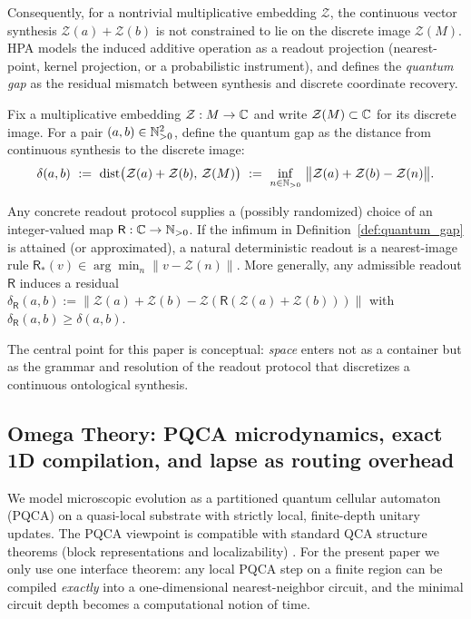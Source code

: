 Consequently, for a nontrivial multiplicative embedding $\mathcal{Z}$, the continuous vector synthesis $\mathcal{Z}(a)+\mathcal{Z}(b)$ is not constrained to lie on the discrete image $\mathcal{Z}(M)$. HPA models the induced additive operation as a readout projection (nearest-point, kernel projection, or a probabilistic instrument), and defines the \emph{quantum gap} as the residual mismatch between synthesis and discrete coordinate recovery.

\begin{definition}
\label{def:quantum_gap}
Fix a multiplicative embedding $\mathcal{Z}:M\to\mathbb{C}$ and write $\mathcal{Z}(M)\subset\mathbb{C}$ for its discrete image. For a pair $(a,b)\in\mathbb{N}_{>0}^2$, define the quantum gap as the distance from continuous synthesis to the discrete image:
\begin{equation}
\delta(a,b)\ :=\ \mathrm{dist}\bigl(\mathcal{Z}(a)+\mathcal{Z}(b),\,\mathcal{Z}(M)\bigr)
\ :=\ \inf_{n\in\NN_{>0}}\ \bigl\|\mathcal{Z}(a)+\mathcal{Z}(b)-\mathcal{Z}(n)\bigr\|.
\end{equation}
\end{definition}

\begin{remark}
\label{rem:readout_as_minimizer}
Any concrete readout protocol supplies a (possibly randomized) choice of an integer-valued map $\mathsf{R}:\mathbb{C}\to\mathbb{N}_{>0}$.
If the infimum in Definition~\ref{def:quantum_gap} is attained (or approximated), a natural deterministic readout is a nearest-image rule
$\mathsf{R}_*(v)\in\arg\min_{n}\|v-\mathcal{Z}(n)\|$.
More generally, any admissible readout $\mathsf{R}$ induces a residual
$\delta_{\mathsf{R}}(a,b):=\|\mathcal{Z}(a)+\mathcal{Z}(b)-\mathcal{Z}(\mathsf{R}(\mathcal{Z}(a)+\mathcal{Z}(b)))\|$
with $\delta_{\mathsf{R}}(a,b)\ge \delta(a,b)$.
\end{remark}

The central point for this paper is conceptual: \emph{space} enters not as a container but as the grammar and resolution of the readout protocol that discretizes a continuous ontological synthesis.

\subsection{Omega Theory: PQCA microdynamics, exact 1D compilation, and lapse as routing overhead}
\label{subsec:omega_basics}
We model microscopic evolution as a partitioned quantum cellular automaton (PQCA) on a quasi-local substrate with strictly local, finite-depth unitary updates.
The PQCA viewpoint is compatible with standard QCA structure theorems (block representations and localizability) \cite{SchumacherWerner2004,ArrighiNesmeWerner2011}.
For the present paper we only use one interface theorem: any local PQCA step on a finite region can be compiled \emph{exactly} into a one-dimensional nearest-neighbor circuit, and the minimal circuit depth becomes a computational notion of time.

